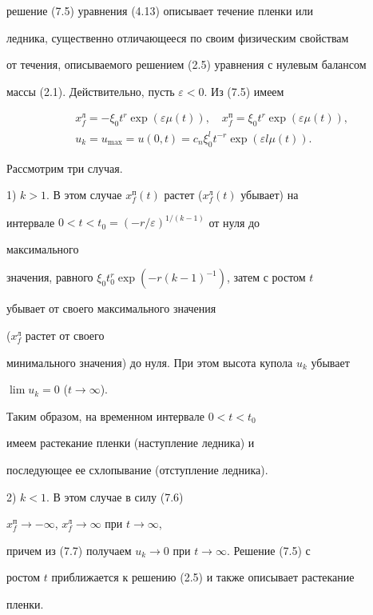 решение (7.5) уравнения  (4.13)  описывает  течение  пленки или


ледника, существенно отличающееся по своим физическим свойствам


от течения, описываемого решением (2.5) уравнения с нулевым балансом


массы (2.1). Действительно, пусть $\varepsilon<0$. Из (7.5) имеем


\begin{align}


&x^л_f=-\xi_0t^r\exp(\varepsilon\mu(t)),\quad


x^п_f=\xi_0 t^r\exp(\varepsilon\mu(t)),\\


&u_k=u_{\max}=u(0,t)=c_n\xi^l_0t^{-r}


\exp(\varepsilon l\mu(t)).


\end{align}


Рассмотрим три случая.





1) $k>1$. В этом случае $x^п_f(t)$ растет ($x^л_f(t)$ убывает) на


интервале  $0<t<t_0=(-r/\varepsilon)^{1/(k-1)}$ от нуля до


максимального


значения, равного $\xi_0t^r_0\exp(-r(k-1)^{-1})$, затем с ростом $t$


убывает от своего максимального значения


($x^л_f$  растет от своего


минимального значения) до нуля. При этом высота купола  $u_k$  убывает


$\lim u_k=0$ ($t\to\infty$).


Таким образом, на временном интервале $0<t<t_0$


имеем растекание пленки (наступление ледника) и


последующее ее схлопывание (отступление ледника).





2) $k<1$. В этом случае в силу (7.6)


$x^п_f\to -\infty$, $x^л_f\to\infty$ при $t\to\infty$,


причем из (7.7) получаем $u_k\to 0$ при $t\to\infty$. Решение (7.5) с


ростом  $t$ приближается к решению (2.5) и также описывает растекание


пленки.





